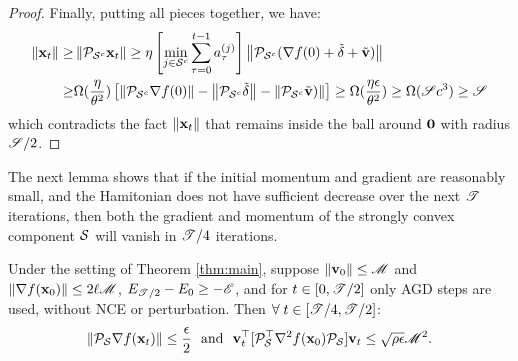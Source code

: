\begin{proof}
Finally, putting all pieces together, we have:
\begin{align*}
\norm{\x_t} \ge& \norm{\proj_{\S^c}\x_t}  \ge \eta \left[\min_{j\in\S^c}\sum_{\tau = 0}^{t-1} a_\tau^{(j)}\right]
\norm{\proj_{\S^c} (\grad f(0) + \tilde{\delta} + \tilde{\v})}\\
\ge& \Omega(\frac{\eta}{\theta^2})\left[\norm{\proj_{\S^c} \grad f(0)} - \norm{\proj_{\S^c}\tilde{\delta}} - \norm{\proj_{\S^c}\tilde{\v})}\right]
\ge \Omega(\frac{\eta\epsilon}{\theta^2}) \ge \Omega(\uspace c^3) \ge \uspace
\end{align*}
which contradicts the fact $\norm{\x_t}$ that remains inside the ball around $\zero$ with radius $\uspace/2$.
\end{proof}

The next lemma shows that if the initial momentum and gradient are 
reasonably small, and the Hamitonian does not have sufficient decrease 
over the next $\utime$ iterations, then both the gradient and momentum 
of the strongly convex component $\S$ will vanish in $\utime/4$ iterations.

\begin{lemma}\label{lem:largegrad_convex}
Under the setting of Theorem \ref{thm:main}, suppose $\norm{\v_0}\le \umom$ and $\norm{\grad f(\x_0)} \le 2\ell\umom$, $E_{\utime/2} - E_0 \ge - \ufun$,
and for $t\in [0, \utime/2]$ only AGD steps are used, without NCE or perturbation.
Then $\forall \; t\in [\utime/4, \utime/2]$:
    \begin{equation*}
    \norm{\proj_\S\grad f(\x_{t})} \le \frac{\epsilon}{2}
    \text{~~and~~}
    \v_t\trans [\proj_\S\trans \hess f(\x_0) \proj_\S] \v_t \le \sqrt{\rho\epsilon}\umom^2.
    \end{equation*}
\end{lemma}

